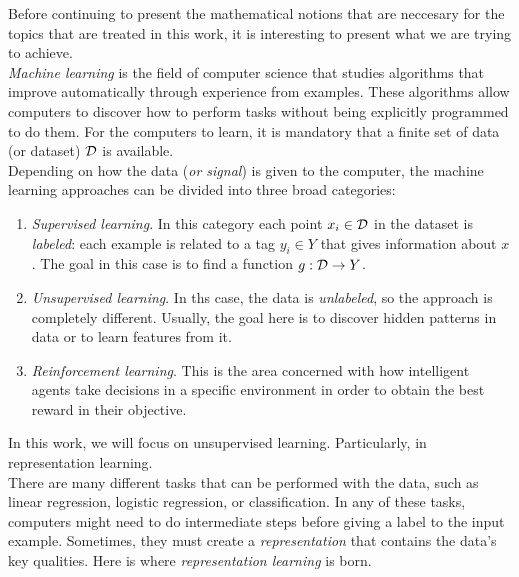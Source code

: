 


Before continuing to present the mathematical notions that are neccesary for the topics that are treated in this work, it is interesting to present what we are trying to achieve.\\

\emph{Machine learning} is the field of computer science that studies algorithms that improve automatically through experience from examples. 
These algorithms allow computers to discover how to
perform tasks without being explicitly programmed to do them. For the computers to learn, it is mandatory that a finite set of data (or dataset) $\mathcal{D}$ is available. \\

Depending on how the data (\emph{or signal}) is given to the computer, the machine learning approaches can be divided into three broad categories:
\begin{enumerate}
    \item \emph{Supervised learning}. In this category each point $x_i \in \mathcal{D}$ in the dataset is \emph{labeled}: each example is related to a tag $y_i \in Y$ that gives information about $x$. The goal in this case is to find 
    a function $g:\mathcal{D} \to Y$.
    \item \emph{Unsupervised learning}. In ths case, the data is \emph{unlabeled}, so the approach is completely different. Usually, the goal here is to discover hidden patterns in data or to learn features from it.
    \item \emph{Reinforcement learning}. This is the area concerned with how intelligent agents take decisions in a specific environment in order to obtain the best reward in their objective.
\end{enumerate}

In this work, we will focus on unsupervised learning. Particularly, in representation learning.\\




There are many different tasks that can be performed with the data, such as linear regression, logistic regression, or classification. In any of these tasks, computers might need
to do intermediate steps before giving a label to the input example. Sometimes, they must create a \emph{representation} that 
contains the data's key qualities.  Here is where \emph{representation learning} is born. 


